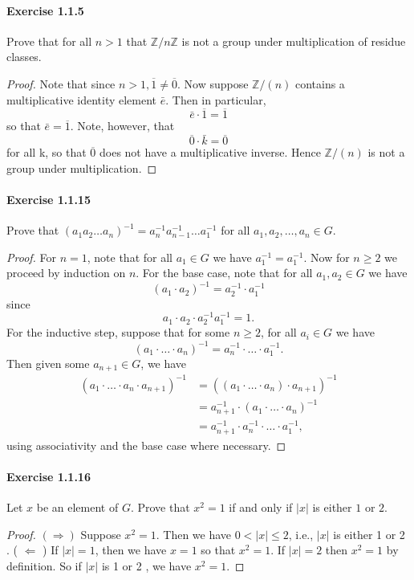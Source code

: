 \documentclass{article}
\theoremstyle{definition}
\begin{document}
\paragraph{Exercise 1.1.5} Prove that for all $n>1$ that $\mathbb{Z}/n\mathbb{Z}$ is not a group under multiplication of residue classes.
\begin{proof}
    Note that since $n>1, \overline{1} \neq \overline{0}$. Now suppose $\mathbb{Z} /(n)$ contains a multiplicative identity element $\bar{e}$. Then in particular,
$$
\bar{e} \cdot \overline{1}=\overline{1}
$$
so that $\bar{e}=\overline{1}$. Note, however, that
$$
\overline{0} \cdot \bar{k}=\overline{0}
$$
for all k, so that $\overline{0}$ does not have a multiplicative inverse. Hence $\mathbb{Z} /(n)$ is not a group under multiplication.
\end{proof}


\paragraph{Exercise 1.1.15} Prove that $(a_1a_2\dots a_n)^{-1} = a_n^{-1}a_{n-1}^{-1}\dots a_1^{-1}$ for all $a_1, a_2, \dots, a_n\in G$.
\begin{proof}
    For $n=1$, note that for all $a_1 \in G$ we have $a_1^{-1}=a_1^{-1}$.
Now for $n \geq 2$ we proceed by induction on $n$. For the base case, note that for all $a_1, a_2 \in G$ we have
$$
\left(a_1 \cdot a_2\right)^{-1}=a_2^{-1} \cdot a_1^{-1}
$$
since
$$
a_1 \cdot a_2 \cdot a_2^{-1} a_1^{-1}=1 .
$$
For the inductive step, suppose that for some $n \geq 2$, for all $a_i \in G$ we have
$$
\left(a_1 \cdot \ldots \cdot a_n\right)^{-1}=a_n^{-1} \cdot \ldots \cdot a_1^{-1} .
$$
Then given some $a_{n+1} \in G$, we have
$$
\begin{aligned}
\left(a_1 \cdot \ldots \cdot a_n \cdot a_{n+1}\right)^{-1} &=\left(\left(a_1 \cdot \ldots \cdot a_n\right) \cdot a_{n+1}\right)^{-1} \\
&=a_{n+1}^{-1} \cdot\left(a_1 \cdot \ldots \cdot a_n\right)^{-1} \\
&=a_{n+1}^{-1} \cdot a_n^{-1} \cdot \ldots \cdot a_1^{-1},
\end{aligned}
$$
using associativity and the base case where necessary.
\end{proof}


\paragraph{Exercise 1.1.16} Let $x$ be an element of $G$. Prove that $x^2=1$ if and only if $|x|$ is either $1$ or $2$.
\begin{proof}
    $(\Rightarrow)$ Suppose $x^2=1$. Then we have $0<|x| \leq 2$, i.e., $|x|$ is either 1 or 2 .
( $\Leftarrow$ ) If $|x|=1$, then we have $x=1$ so that $x^2=1$. If $|x|=2$ then $x^2=1$ by definition. So if $|x|$ is 1 or 2 , we have $x^2=1$.
\end{proof}
\end{document}
